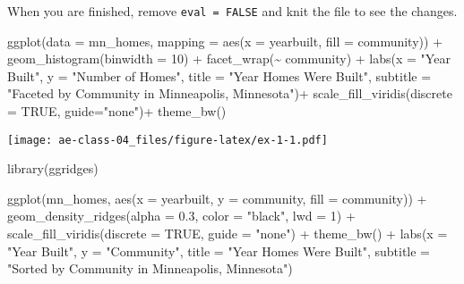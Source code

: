 \documentclass[
]{article}
\newenvironment{Shaded}{\begin{snugshade}}{\end{snugshade}}
\newcommand{\AttributeTok}[1]{\textcolor[rgb]{0.77,0.63,0.00}{#1}}
\newcommand{\ConstantTok}[1]{\textcolor[rgb]{0.00,0.00,0.00}{#1}}
\newcommand{\DecValTok}[1]{\textcolor[rgb]{0.00,0.00,0.81}{#1}}
\newcommand{\FloatTok}[1]{\textcolor[rgb]{0.00,0.00,0.81}{#1}}
\newcommand{\FunctionTok}[1]{\textcolor[rgb]{0.00,0.00,0.00}{#1}}
\newcommand{\NormalTok}[1]{#1}
\newcommand{\SpecialCharTok}[1]{\textcolor[rgb]{0.00,0.00,0.00}{#1}}
\newcommand{\StringTok}[1]{\textcolor[rgb]{0.31,0.60,0.02}{#1}}
\begin{document}
When you are finished, remove \texttt{eval\ =\ FALSE} and knit the file
to see the changes.

\begin{Shaded}
\begin{Highlighting}[]
\FunctionTok{ggplot}\NormalTok{(}\AttributeTok{data =}\NormalTok{ mn\_homes, }\AttributeTok{mapping =} \FunctionTok{aes}\NormalTok{(}\AttributeTok{x =}\NormalTok{ yearbuilt, }\AttributeTok{fill =}\NormalTok{ community)) }\SpecialCharTok{+}
  \FunctionTok{geom\_histogram}\NormalTok{(}\AttributeTok{binwidth =} \DecValTok{10}\NormalTok{) }\SpecialCharTok{+}
  \FunctionTok{facet\_wrap}\NormalTok{(}\SpecialCharTok{\textasciitilde{}}\NormalTok{ community) }\SpecialCharTok{+}
  \FunctionTok{labs}\NormalTok{(}\AttributeTok{x =} \StringTok{"Year Built"}\NormalTok{, }
       \AttributeTok{y =} \StringTok{"Number of Homes"}\NormalTok{,}
      \AttributeTok{title =} \StringTok{"Year Homes Were Built"}\NormalTok{, }
      \AttributeTok{subtitle =} \StringTok{"Faceted by Community in Minneapolis, Minnesota"}\NormalTok{)}\SpecialCharTok{+}
  \FunctionTok{scale\_fill\_viridis}\NormalTok{(}\AttributeTok{discrete =} \ConstantTok{TRUE}\NormalTok{, }\AttributeTok{guide=}\StringTok{"none"}\NormalTok{)}\SpecialCharTok{+}
  \FunctionTok{theme\_bw}\NormalTok{()}
\end{Highlighting}
\end{Shaded}

\texttt{[image: ae-class-04\_files/figure-latex/ex-1-1.pdf]}

\begin{Shaded}
\begin{Highlighting}[]
\FunctionTok{library}\NormalTok{(ggridges)}

\FunctionTok{ggplot}\NormalTok{(mn\_homes, }\FunctionTok{aes}\NormalTok{(}\AttributeTok{x =}\NormalTok{ yearbuilt, }\AttributeTok{y =}\NormalTok{ community, }\AttributeTok{fill =}\NormalTok{ community)) }\SpecialCharTok{+}
  \FunctionTok{geom\_density\_ridges}\NormalTok{(}\AttributeTok{alpha =} \FloatTok{0.3}\NormalTok{, }\AttributeTok{color =} \StringTok{"black"}\NormalTok{, }\AttributeTok{lwd =} \DecValTok{1}\NormalTok{) }\SpecialCharTok{+}
  \FunctionTok{scale\_fill\_viridis}\NormalTok{(}\AttributeTok{discrete =} \ConstantTok{TRUE}\NormalTok{, }\AttributeTok{guide =} \StringTok{"none"}\NormalTok{) }\SpecialCharTok{+}
  \FunctionTok{theme\_bw}\NormalTok{() }\SpecialCharTok{+}
  \FunctionTok{labs}\NormalTok{(}\AttributeTok{x =} \StringTok{"Year Built"}\NormalTok{, }\AttributeTok{y =} \StringTok{"Community"}\NormalTok{, }\AttributeTok{title =} \StringTok{"Year Homes Were Built"}\NormalTok{,}
       \AttributeTok{subtitle =} \StringTok{"Sorted by Community in Minneapolis, Minnesota"}\NormalTok{)}
\end{Highlighting}
\end{Shaded}
\end{document}
